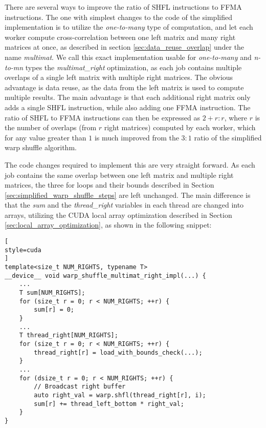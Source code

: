 There are several ways to improve the ratio of SHFL instructions to FFMA instructions. The one with simplest changes to the code of the simplified implementation is to utilize the \textit{one-to-many} type of computation, and let each worker compute cross-correlation between one left matrix and many right matrices at once, as described in section \ref{sec:data_reuse_overlap} under the name \textit{multimat}. We call this exact implementation usable for \textit{one-to-many} and \textit{n-to-mn} types the \textit{multimat\_right} optimization, as each job contains multiple overlaps of a single left matrix with multiple right matrices. The obvious advantage is data reuse, as the data from the left matrix is used to compute multiple results. The main advantage is that each additional right matrix only adds a single SHFL instruction, while also adding one FFMA instruction. The ratio of SHFL to FFMA instructions can then be expressed as $2 + r : r$, where $r$ is the number of overlaps (from $r$ right matrices) computed by each worker, which for any value greater than $1$ is much improved from the $3:1$ ratio of the simplified warp shuffle algorithm.


The code changes required to implement this are very straight forward. As each job contains the same overlap between one left matrix and multiple right matrices, the three for loops and their bounds described in Section \ref{sec:simplified_warp_shuffle_steps} are left unchanged. The main difference is that the \textit{sum} and the \textit{thread\_right} variables in each thread are changed into arrays, utilizing the CUDA local array optimization described in Section \ref{sec:local_array_optimization}, as shown in the following snippet:

\begin{lstlisting}[
style=cuda
]
template<size_t NUM_RIGHTS, typename T>
__device__ void warp_shuffle_multimat_right_impl(...) {
	...
	T sum[NUM_RIGHTS];
	for (size_t r = 0; r < NUM_RIGHTS; ++r) {
		sum[r] = 0;
	}
	...
	T thread_right[NUM_RIGHTS];
	for (size_t r = 0; r < NUM_RIGHTS; ++r) {
		thread_right[r] = load_with_bounds_check(...);
	}
	...
	for (dsize_t r = 0; r < NUM_RIGHTS; ++r) {
		// Broadcast right buffer
		auto right_val = warp.shfl(thread_right[r], i);
		sum[r] += thread_left_bottom * right_val;
	}
}
\end{lstlisting}

